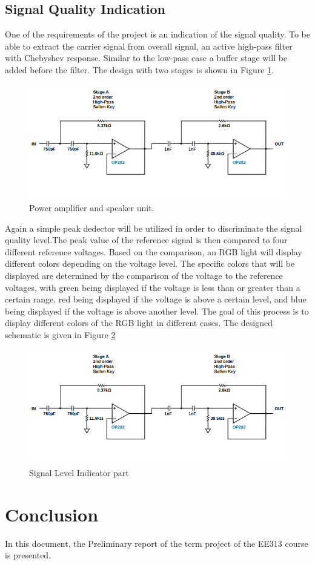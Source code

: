\documentclass[a4paper,10pt]{IEEEtran}
\begin{document}
\subsection{Signal Quality Indication}
One of the requirements of the project is an indication of the signal quality. To be able to extract the carrier signal from overall signal, an active high-pass filter with Chebyshev response. Similar to the low-pass case a buffer stage will be added before the filter. The design with two stages is shown in Figure \ref*{active_high}.
\begin{figure}[H]
    \centering
    \includegraphics[width = 0.75\linewidth]{active_high_pass_circuit.png}
    \caption{Power amplifier and speaker unit.}
    \label{active_high}    
\end{figure} 

Again a simple peak dedector will be utilized in order to discriminate the signal quality level.The peak value of the reference signal is then compared to four different reference voltages. Based on the comparison, an RGB light will display different colors depending on the voltage level. The specific colors that will be displayed are determined by the comparison of the voltage to the reference voltages, with green being displayed if the voltage is less than or greater than a certain range, red being displayed if the voltage is above a certain level, and blue being displayed if the voltage is above another level. The goal of this process is to display different colors of the RGB light in different cases. The designed schematic is given in Figure \ref*{indicator}
\begin{figure}[H]
    \centering
    \includegraphics[width = 0.75\linewidth]{active_high_pass_circuit.png}
    \caption{Signal Level Indicator part}
    \label{indicator}    
\end{figure} 
\section{Conclusion}
In this document, the Preliminary report of the term project of the EE313 course is presented. 
\end{document}
